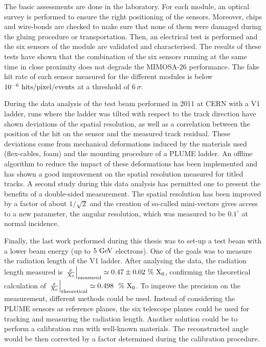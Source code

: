 The basic assessments are done in the laboratory.
For each module, an optical survey is performed to ensure the right positioning of the sensors.
Moreover, chips and wire-bonds are checked to make sure that none of them were damaged during the gluing procedure or transportation.
Then, an electrical test is performed and the six sensors of the module are validated and characterised.
The results of these tests have shown that the combination of the six sensors running at the same time in close proximity does not degrade the \gls{MIMOSA}-26 performance.
The fake hit rate of each sensor measured for the different modules is below $10^{-6}~\rm{hits/pixel/events}$ at a threshold of $6~\sigma$.

During the data analysis of the test beam performed in 2011 at \gls{CERN} with a V1 ladder, runs where the ladder was tilted with respect to the track direction have shown deviations of the spatial resolution, as well as a correlation between the position of the hit on the sensor and the measured track residual.
These deviations come from mechanical deformations induced by the materials used (flex-cables, foam) and the mounting procedure of a \gls{PLUME} ladder.
An offline algorithm to reduce the impact of these deformations has been implemented and has shown a good improvement on the spatial resolution measured for titled tracks.
A second study during this data analysis has permitted one to present the benefits of a double-sided measurement. 
The spatial resolution has been improved by a factor of about $1/\sqrt{2}$ and the creation of so-called mini-vectors gives access to a new parameter, the angular resolution, which was measured to be $0.1^{\circ}$ at normal incidence.

Finally, the last work performed during this thesis was to set-up a test beam with a lower beam energy (up to $5~\rm{GeV}$ electrons).
One of the goals was to measure the radiation length of the V1 ladder.
After analysing the data, the radiation length measured is $\left. \frac{x}{X_0} \right|_{\rm{measured}} \simeq 0.47 \pm 0.02~\%~\rm{X_0}$, confirming the theoretical calculation of $\left. \frac{x}{X_0}\right|_{\rm{theoretical}} \simeq 0.498~~\%~\rm{X_0}$.
To improve the precision on the measurement, different methods could be used.
Instead of considering the \gls{PLUME} sensors as reference planes, the six telescope planes could be used for tracking and measuring the radiation length.
Another solution could be to perform a calibration run with well-known materials. 
The reconstructed angle would be then corrected by a factor determined during the calibration procedure.


